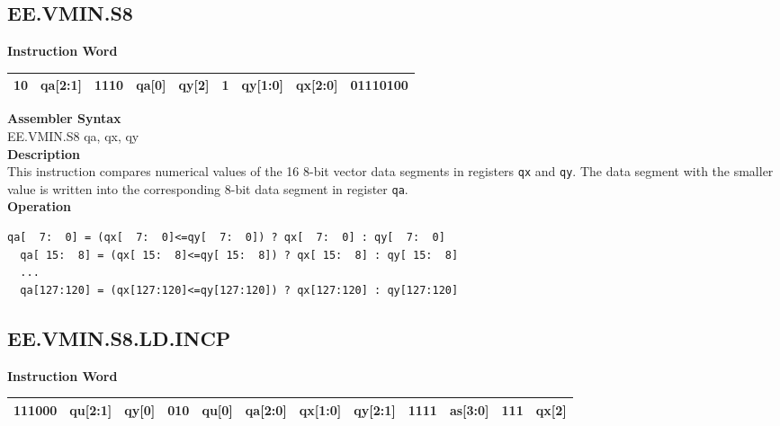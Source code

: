 \clearpage
\subsection{EE.VMIN.S8}\label{instruction:EEVMINS8}
\setlength\tabcolsep{6pt}
\textbf{Instruction Word} \\
\begin{tabular}{|c|c|c|c|c|c|c|c|c|}
	\hline
	10 & qa[2:1] & 1110 & qa[0] & qy[2] & 1 & qy[1:0] & qx[2:0] & 01110100 \\
	\hline
\end{tabular}

\textbf{Assembler Syntax} \\
EE.VMIN.S8 qa, qx, qy \\
\textbf{Description} \\
This instruction compares numerical values of the 16 8-bit vector data segments in registers \lstinline{qx} and \lstinline{qy}. The data segment with the smaller value is written into the corresponding 8-bit data segment in register \lstinline{qa}.\\
\textbf{Operation}
\begin{lstlisting}[escapeinside=`?]
  qa[  7:  0] = (qx[  7:  0]<=qy[  7:  0]) ? qx[  7:  0] : qy[  7:  0]
  qa[ 15:  8] = (qx[ 15:  8]<=qy[ 15:  8]) ? qx[ 15:  8] : qy[ 15:  8]
  ...
  qa[127:120] = (qx[127:120]<=qy[127:120]) ? qx[127:120] : qy[127:120]
\end{lstlisting}

\clearpage
\subsection{EE.VMIN.S8.LD.INCP}\label{instruction:EEVMINS8LDINCP}
\setlength\tabcolsep{6pt}
\textbf{Instruction Word} \\
\begin{tabular}{|c|c|c|c|c|c|c|c|c|c|c|c|}
	\hline
	111000 & qu[2:1] & qy[0] & 010 & qu[0] & qa[2:0] & qx[1:0] & qy[2:1] & 1111 & as[3:0] & 111 & qx[2] \\
	\hline
\end{tabular}

